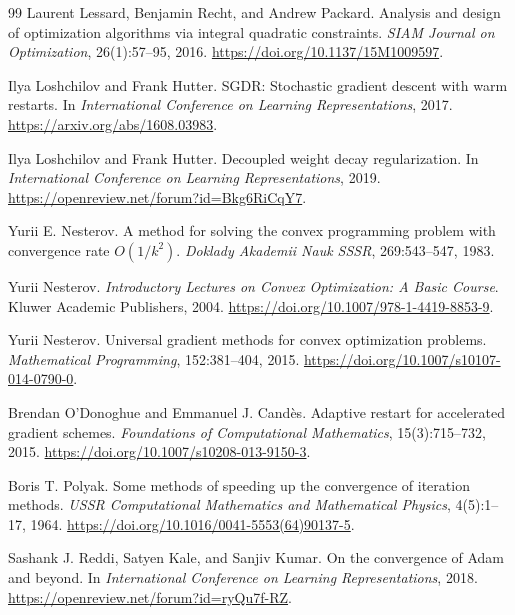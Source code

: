 \documentclass[11pt,twoside]{article}
\theoremstyle{definition}
\theoremstyle{remark}
\begin{document}
\begin{thebibliography}{99}
Laurent Lessard, Benjamin Recht, and Andrew Packard.
\newblock Analysis and design of optimization algorithms via integral
quadratic constraints.
\newblock \emph{SIAM Journal on Optimization}, 26(1):57--95, 2016.
\newblock \url{https://doi.org/10.1137/15M1009597}.

Ilya Loshchilov and Frank Hutter.
\newblock SGDR: Stochastic gradient descent with warm restarts.
\newblock In \emph{International Conference on Learning Representations},
2017.
\newblock \url{https://arxiv.org/abs/1608.03983}.

Ilya Loshchilov and Frank Hutter.
\newblock Decoupled weight decay regularization.
\newblock In \emph{International Conference on Learning Representations},
2019.
\newblock \url{https://openreview.net/forum?id=Bkg6RiCqY7}.

Yurii E. Nesterov.
\newblock A method for solving the convex programming problem with convergence
rate $O(1/k^2)$.
\newblock \emph{Doklady Akademii Nauk SSSR}, 269:543--547, 1983.

Yurii Nesterov.
\newblock \emph{Introductory Lectures on Convex Optimization: A Basic Course}.
\newblock Kluwer Academic Publishers, 2004.
\newblock \url{https://doi.org/10.1007/978-1-4419-8853-9}.

Yurii Nesterov.
\newblock Universal gradient methods for convex optimization problems.
\newblock \emph{Mathematical Programming}, 152:381--404, 2015.
\newblock \url{https://doi.org/10.1007/s10107-014-0790-0}.

Brendan O'Donoghue and Emmanuel J. Cand\`es.
\newblock Adaptive restart for accelerated gradient schemes.
\newblock \emph{Foundations of Computational Mathematics}, 15(3):715--732,
2015.
\newblock \url{https://doi.org/10.1007/s10208-013-9150-3}.

Boris T. Polyak.
\newblock Some methods of speeding up the convergence of iteration methods.
\newblock \emph{USSR Computational Mathematics and Mathematical Physics},
4(5):1--17, 1964.
\newblock \url{https://doi.org/10.1016/0041-5553(64)90137-5}.

Sashank J. Reddi, Satyen Kale, and Sanjiv Kumar.
\newblock On the convergence of Adam and beyond.
\newblock In \emph{International Conference on Learning Representations},
2018.
\newblock \url{https://openreview.net/forum?id=ryQu7f-RZ}.


\end{thebibliography}
\end{document}
